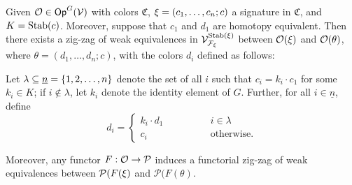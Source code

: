 \documentclass[psamsfonts,oneside,10pt,letterpaper
,draft
]{amsart}%
\renewcommand{\C}{\ensuremath{\mathfrak{C}}}
\renewcommand{\F}{\mathcal F}
\renewcommand{\1}{\ensuremath{\mathbb{id}}}
\renewcommand{\P}{\ensuremath{\mathcal{P}}}
\begin{document}
\begin{proposition}
      \label{CAV_4.14_PROP}
      Given $\mathcal{O} \in \mathsf{Op}^G(\mathcal V)$ with colors $\C$, $\xi = (c_1,\dots,c_n;c)$ a signature in $\C$, and $K = \mathrm{Stab}(c)$.
      Moreover, suppose that $c_1$ and $d_1$ are homotopy equivalent.
      Then there exists a zig-zag of weak equivalences in $\V^{\Stab(\ksi)}_{\F_\ksi}$ between
      $\mathcal{O}(\xi)$ and $\mathcal{O}(\theta)$, where
      $\theta = (d_1,\ldots, d_n; c)$, with the colors $d_i$ defined as follows:
      
      Let $\lambda \subseteq \underline{n} = \left\{1,2,\ldots, n\right\}$ denote
      the set of all $i$ such that $c_i = k_i \cdot c_1$ for some $k_i\in K$;
      if $i \notin \lambda$, let $k_i$ denote the identity element of $G$.
      Further, for all $i \in \underline{n}$, define
      \begin{equation}
            \label{DCOLORS_EQ}
            d_i =
            \begin{cases}
                  k_i \cdot d_1 \qquad \qquad & i \in \lambda
                  \\
                  c_i & \mbox{otherwise.}
            \end{cases}
      \end{equation}

      Moreover, any functor $F: \O \to \P$ induces a functorial zig-zag of weak equivalences between
      $\P(F(\ksi)$ and $\P(F(\theta)$.
\end{proposition}
\end{document}

